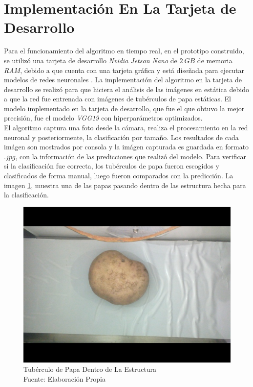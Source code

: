 \section{Implementación En La Tarjeta de Desarrollo}

Para el funcionamiento del algoritmo en tiempo real, en el prototipo construido, se utilizó una tarjeta de desarrollo \textit{Nvidia Jetson Nano} de $2 \ GB$ de memoria \textit{RAM}, debido a que cuenta con una tarjeta gráfica y está diseñada para ejecutar modelos de redes neuronales \cite{cass2020nvidia}. La implementación del algoritmo en la tarjeta de desarrollo se realizó para que hiciera el análisis de las imágenes en estática debido a que la red fue entrenada con imágenes de tubérculos de papa estáticas. El modelo implementado en la tarjeta de desarrollo, que fue el que obtuvo la mejor precisión, fue el modelo \textit{VGG19} con hiperparámetros optimizados.\\

El algoritmo captura una foto desde la cámara, realiza el procesamiento en la red neuronal y posteriormente, la clasificación por tamaño. Los resultados de cada imágen son mostrados por consola y la imágen capturada es guardada en formato $.jpg$, con la información de las predicciones que realizó del modelo. Para verificar si la clasificación fue correcta, los tubérculos de papa fueron escogidos y clasificados de forma manual, luego fueron comparados con la predicción. La imagen \ref{fig:implementacion}, muestra una de las papas pasando dentro de las estructura hecha para la clasificación.

\begin{figure}[ht]
	\centering
	\includegraphics[scale=0.3]{Figs/implementacion.jpg}
	\caption{Tubérculo de Papa Dentro de La Estructura\\Fuente: Elaboración Propia}
	\label{fig:implementacion}
\end{figure}

